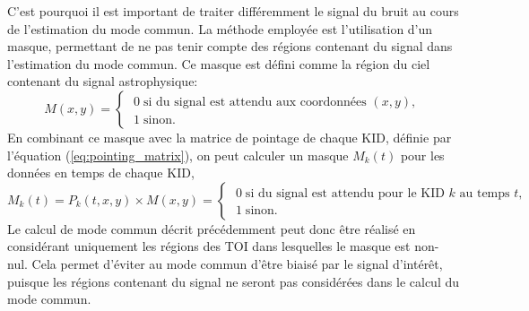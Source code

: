 C'est pourquoi il est important de traiter différemment le signal du bruit au cours de l'estimation du mode commun.
La méthode employée est l'utilisation d'un masque, permettant de ne pas tenir compte des régions contenant du signal dans l'estimation du mode commun.
Ce masque est défini comme la région du ciel contenant du signal astrophysique:
\begin{equation}
    M(x, y) =
        \begin{cases}
            \; 0 \;\text{si du signal est attendu aux coordonnées $(x, y)$}, \\
            \; 1 \;\text{sinon.}
        \end{cases}
\end{equation}
En combinant ce masque avec la matrice de pointage de chaque KID, définie par l'équation (\ref{eq:pointing_matrix}), on peut calculer un masque $M_k(t)$ pour les données en temps de chaque KID,
\begin{equation}
    \label{eq:mask_time}
    M_k(t) = P_k(t, x, y) \times M(x, y) =
        \begin{cases}
            \; 0 \;\text{si du signal est attendu pour le KID $k$ au temps $t$}, \\
            \; 1 \;\text{sinon.}
        \end{cases}
\end{equation}
Le calcul de mode commun décrit précédemment peut donc être réalisé en considérant uniquement les régions des TOI dans lesquelles le masque est non-nul.
Cela permet d'éviter au mode commun d'être biaisé par le signal d'intérêt, puisque les régions contenant du signal ne seront pas considérées dans le calcul du mode commun.

